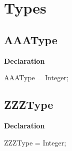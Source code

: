 \documentclass{report}
\newif\ifpdf
\begin{document}
\section{Types}
\ifpdf
\subsection*{\large{\textbf{AAAType}}\normalsize\hspace{1ex}\hrulefill}
\else
\subsection*{AAAType}
\fi
\label{ok_sorting-AAAType}
\begin{list}{}{
\setlength{\itemindent}{0cm}
\setlength{\listparindent}{0cm}
\setlength{\leftmargin}{\evensidemargin}
\addtolength{\leftmargin}{\tmplength}
\settowidth{\labelsep}{X}
\addtolength{\leftmargin}{\labelsep}
\setlength{\labelwidth}{\tmplength}
}
\item[\textbf{Declaration}\hfill]
\ifpdf
\begin{flushleft}
\fi
\begin{ttfamily}
AAAType = Integer;\end{ttfamily}

\ifpdf
\end{flushleft}
\fi

\end{list}
\ifpdf
\subsection*{\large{\textbf{ZZZType}}\normalsize\hspace{1ex}\hrulefill}
\else
\subsection*{ZZZType}
\fi
\label{ok_sorting-ZZZType}
\begin{list}{}{
\setlength{\itemindent}{0cm}
\setlength{\listparindent}{0cm}
\setlength{\leftmargin}{\evensidemargin}
\addtolength{\leftmargin}{\tmplength}
\settowidth{\labelsep}{X}
\addtolength{\leftmargin}{\labelsep}
\setlength{\labelwidth}{\tmplength}
}
\item[\textbf{Declaration}\hfill]
\ifpdf
\begin{flushleft}
\fi
\begin{ttfamily}
ZZZType = Integer;\end{ttfamily}

\ifpdf
\end{flushleft}
\fi

\end{list}
\end{document}
